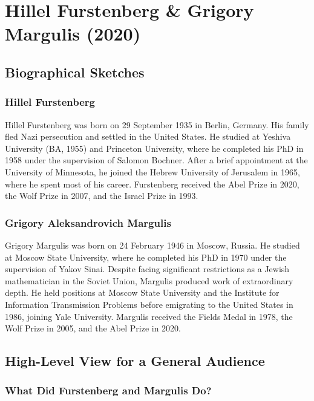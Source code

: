 \chapter{Hillel Furstenberg \& Grigory Margulis (2020)}

\section{Biographical Sketches}



\subsection{Hillel Furstenberg}
Hillel Furstenberg was born on 29 September 1935 in Berlin, Germany. His family fled Nazi persecution and settled in the United States. He studied at Yeshiva University (BA, 1955) and Princeton University, where he completed his PhD in 1958 under the supervision of Salomon Bochner. After a brief appointment at the University of Minnesota, he joined the Hebrew University of Jerusalem in 1965, where he spent most of his career. Furstenberg received the Abel Prize in 2020, the Wolf Prize in 2007, and the Israel Prize in 1993.

\subsection{Grigory Aleksandrovich Margulis}
Grigory Margulis was born on 24 February 1946 in Moscow, Russia. He studied at Moscow State University, where he completed his PhD in 1970 under the supervision of Yakov Sinai. Despite facing significant restrictions as a Jewish mathematician in the Soviet Union, Margulis produced work of extraordinary depth. He held positions at Moscow State University and the Institute for Information Transmission Problems before emigrating to the United States in 1986, joining Yale University. Margulis received the Fields Medal in 1978, the Wolf Prize in 2005, and the Abel Prize in 2020.

\section{High-Level View for a General Audience}

\subsection{What Did Furstenberg and Margulis Do?}

